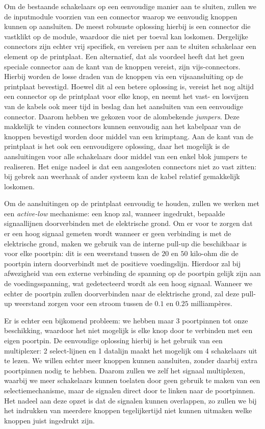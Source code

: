 Om de bestaande schakelaars op een eenvoudige manier aan te sluiten, zullen we de inputmodule voorzien van een connector waarop we eenvoudig knoppen kunnen op aansluiten. De meest robuuste oplossing hierbij is een connector die vastklikt op de module, waardoor die niet per toeval kan loskomen. Dergelijke connectors zijn echter vrij specifiek, en vereisen per aan te sluiten schakelaar een element op de printplaat. Een alternatief, dat als voordeel heeft dat het geen speciale connector aan de kant van de knoppen vereist, zijn vijs-connectors. Hierbij worden de losse draden van de knoppen via een vijsaansluiting op de printplaat bevestigd. Hoewel dit al een betere oplossing is, vereist het nog altijd een connector op de printplaat voor elke knop, en neemt het vast- en losvijzen van de kabels ook meer tijd in beslag dan het aansluiten van een eenvoudige connector. Daarom hebben we gekozen voor de alombekende \emph{jumpers}. Deze makkelijk te vinden connectors kunnen eenvoudig aan het kabelpaar van de knoppen bevestigd worden door middel van een krimptang. Aan de kant van de printplaat is het ook een eenvoudigere oplossing, daar het mogelijk is de aansluitingen voor alle schakelaars door middel van een enkel blok jumpers te realiseren. Het enige nadeel is dat een aangesloten connectors niet zo vast zitten: bij gebrek aan weerhaak of ander systeem kan de kabel relatief gemakkelijk loskomen.

Om de aansluitingen op de printplaat eenvoudig te houden, zullen we werken met een \emph{active-low} mechanisme: een knop zal, wanneer ingedrukt, bepaalde signaallijnen doorverbinden met de elektrische grond. Om er voor te zorgen dat er een hoog signaal gemeten wordt wanneer er geen verbinding is met de elektrische grond, maken we gebruik van de interne pull-up die beschikbaar is voor elke poortpin: dit is een weerstand tussen de $20$ en $50$ kilo-ohm die de poortpin intern doorverbindt met de positieve voedingslijn. Hierdoor zal bij afwezigheid van een externe verbinding de spanning op de poortpin gelijk zijn aan de voedingsspanning, wat gedetecteerd wordt als een hoog signaal. Wanneer we echter de poortpin zullen doorverbinden naar de elektrische grond, zal deze pull-up weerstand zorgen voor een stroom tussen de $0.1$ en $0.25$ milliampères.

Er is echter een bijkomend probleem: we hebben maar 3 poortpinnen tot onze beschikking, waardoor het niet mogelijk is elke knop door te verbinden met een eigen poortpin. De eenvoudige oplossing hierbij is het gebruik van een multiplexer: 2 select-lijnen en 1 datalijn maakt het mogelijk om 4 schakelaars uit te lezen. We willen echter meer knoppen kunnen aansluiten, zonder daarbij extra poortpinnen nodig te hebben. Daarom zullen we zelf het signaal multiplexen, waarbij we meer schakelaars kunnen toelaten door geen gebruik te maken van een selectiemechanisme, maar de signalen direct door te linken naar de poortpinnen. Het nadeel aan deze opzet is dat de signalen kunnen overlappen, zo zullen we bij het indrukken van meerdere knoppen tegelijkertijd niet kunnen uitmaken welke knoppen juist ingedrukt zijn.

